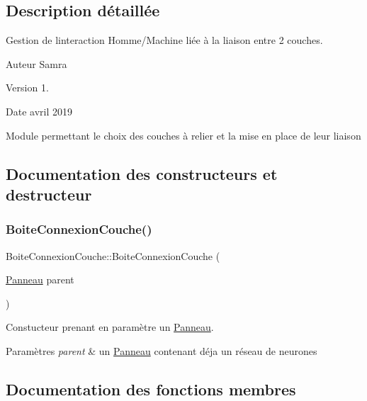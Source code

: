 \subsection{Description détaillée}
Gestion de l\textquotesingle{}interaction Homme/\+Machine liée à la liaison entre 2 couches. 

\begin{DoxyAuthor}{Auteur}
Samra 
\end{DoxyAuthor}
\begin{DoxyVersion}{Version}
1. 
\end{DoxyVersion}
\begin{DoxyDate}{Date}
avril 2019
\end{DoxyDate}
Module permettant le choix des couches à relier et la mise en place de leur liaison 

\subsection{Documentation des constructeurs et destructeur}
\mbox{\label{classBoiteConnexionCouche_a69b773ea326589e81c3beba4f8eef4e7}} 
\subsubsection{\texorpdfstring{Boite\+Connexion\+Couche()}{BoiteConnexionCouche()}}
{\footnotesize\ttfamily Boite\+Connexion\+Couche\+::\+Boite\+Connexion\+Couche (\begin{DoxyParamCaption}\item[{\hyperlink{classPanneau}{Panneau}}]{parent }\end{DoxyParamCaption})}



Constucteur prenant en paramètre un \hyperlink{classPanneau}{Panneau}. 


\begin{DoxyParams}{Paramètres}
{\em parent} & un \hyperlink{classPanneau}{Panneau} contenant déja un réseau de neurones \\
\hline
\end{DoxyParams}


\subsection{Documentation des fonctions membres}
\mbox{\label{classBoiteConnexionCouche_af35c756dfc1f9491e2803b251f2d4434}} 
